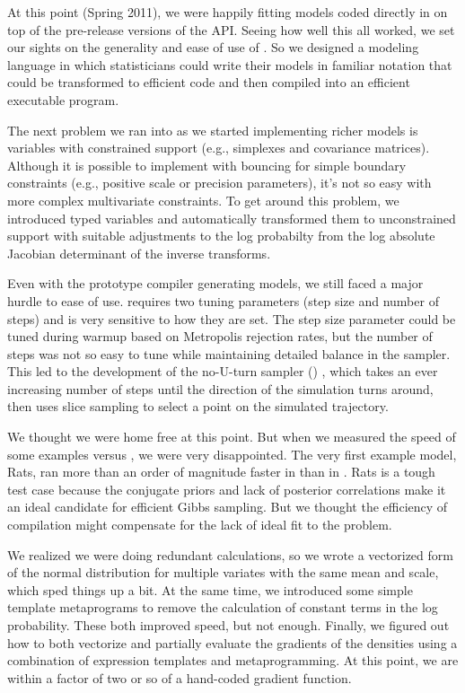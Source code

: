 At this point (Spring 2011), we were happily fitting models coded 
directly in \Cpp on top of the pre-release versions of the \Stan API. 
Seeing how well this all worked, we set our sights on the generality 
and ease of use of \BUGS.  So we designed a modeling language in which 
statisticians could write their models in familiar notation that could 
be transformed to efficient \Cpp code and then compiled into an 
efficient executable program.
 
The next problem we ran into as we started implementing richer models
is variables with constrained support (e.g., simplexes and covariance
matrices).  Although it is possible to implement \HMC with bouncing
for simple boundary constraints (e.g., positive scale or precision
parameters), it's not so easy with more complex multivariate
constraints.  To get around this problem, we introduced typed
variables and automatically transformed them to unconstrained support
with suitable adjustments to the log probabilty from the log absolute
Jacobian determinant of the inverse transforms.

Even with the prototype compiler generating models, we still faced a
major hurdle to ease of use.  \HMC requires two tuning parameters
(step size and number of steps) and is very sensitive to how they are
set.  The step size parameter could be tuned during warmup based on
Metropolis rejection rates, but the number of steps was not so easy to
tune while maintaining detailed balance in the sampler.  This led to
the development of the no-U-turn sampler (\NUTS)
\citep{Hoffman-Gelman:2012}, which takes an ever increasing number of
steps until the direction of the simulation turns around, then uses
slice sampling to select a point on the simulated trajectory.

We thought we were home free at this point.  But when we measured the
speed of some \BUGS examples versus \Stan, we were very disappointed.
The very first example model, Rats, ran more than an order of
magnitude faster in \JAGS than in \Stan.  Rats is a tough test case
because the conjugate priors and lack of posterior correlations make
it an ideal candidate for efficient Gibbs sampling.  But we thought
the efficiency of compilation might compensate for the lack of ideal
fit to the problem.  

We realized we were doing redundant calculations, so we wrote a
vectorized form of the normal distribution for multiple variates with
the same mean and scale, which sped things up a bit. At the same
time, we introduced some simple template metaprograms to remove the
calculation of constant terms in the log probability.  These both
improved speed, but not enough.  Finally, we figured out how to both
vectorize and partially evaluate the gradients of the densities using
a combination of expression templates and metaprogramming.  At this
point, we are within a factor of two or so of a hand-coded gradient
function.

